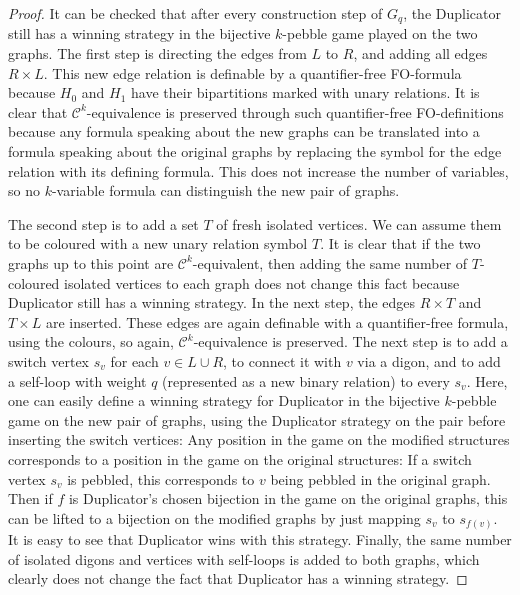 \documentclass[11pt, DIV=15]{scrarticle}
\theoremstyle{definition}
\theoremstyle{plain}
\theoremstyle{remark}
\begin{document}
\begin{proof}
	It can be checked that after every construction step of $G_q$, the Duplicator still has a winning strategy in the bijective $k$-pebble game played on the two graphs.  
	The first step is directing the edges from $L$ to $R$, and adding all edges $ R \times L$. This new edge relation is definable by a quantifier-free FO-formula because $H_0$ and $H_1$ have their bipartitions marked with unary relations.
	It is clear that $\mathcal{C}^k$-equivalence is preserved through such quantifier-free FO-definitions because any formula speaking about the new graphs can be translated into a formula speaking about the original graphs by replacing the symbol for the edge relation with its defining formula. This does not increase the number of variables, so no $k$-variable formula can distinguish the new pair of graphs.
	 
	The second step is to add a set $T$ of fresh isolated vertices. We can assume them to be coloured with a new unary relation symbol $T$. It is clear that if the two graphs up to this point are $\mathcal{C}^k$-equivalent, then adding the same number of $T$-coloured isolated vertices to each graph does not change this fact because Duplicator still has a winning strategy. In the next step, the edges $R \times T$ and $T \times L$ are inserted. These edges are again definable with a quantifier-free formula, using the colours, so again, $\mathcal{C}^k$-equivalence is preserved.
	The next step is to add a switch vertex $s_v$ for each $v \in L \cup R$, to connect it with $v$ via a digon, and to add a self-loop with weight $q$ (represented as a new binary relation) to every $s_v$.
	Here, one can easily define a winning strategy for Duplicator in the bijective $k$-pebble game on the new pair of graphs, using the Duplicator strategy on the pair before inserting the switch vertices: Any position in the game on the modified structures corresponds to a position in the game on the original structures: If a switch vertex $s_v$ is pebbled, this corresponds to $v$ being pebbled in the original graph. Then if $f$ is Duplicator's chosen bijection in the game on the original graphs, this can be lifted to a bijection on the modified graphs by just mapping $s_{v}$ to $s_{f(v)}$. It is easy to see that Duplicator wins with this strategy. 
	Finally, the same number of isolated digons and vertices with self-loops is added to both graphs, which clearly does not change the fact that Duplicator has a winning strategy.
\end{proof}	
\end{document}
